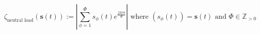 \begin{equation}
	\zeta_\text{neutral load}(\textbf{s}(t)) := \left|\sum_{\phi=1}^{\Phi} s_\phi(t)e^{\frac{j2\phi\pi}{\Phi}}\right| \text{ where } (s_\phi(t)) = \textbf{s}(t) \text{ and } \Phi \in \mathbb{Z}_{>0}
\label{ch1:equ:neutral-load}
\end{equation}